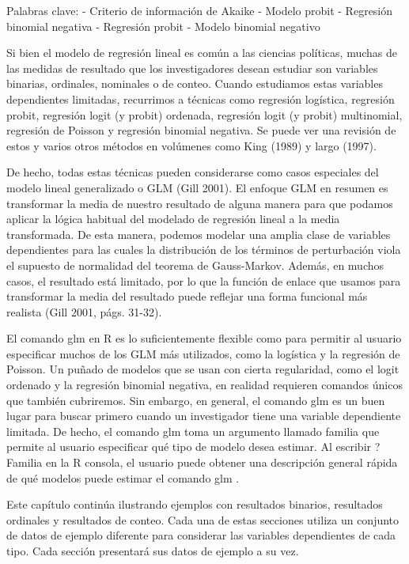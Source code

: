 \documentclass[
]{book}
\begin{document}
Palabras clave:
- Criterio de información de Akaike
- Modelo probit
- Regresión binomial negativa
- Regresión probit
- Modelo binomial negativo

Si bien el modelo de regresión lineal es común a las ciencias políticas, muchas de las medidas de resultado que los investigadores desean estudiar son variables binarias, ordinales, nominales o de conteo. Cuando estudiamos estas variables dependientes limitadas, recurrimos a técnicas como regresión logística, regresión probit, regresión logit (y probit) ordenada, regresión logit (y probit) multinomial, regresión de Poisson y regresión binomial negativa. Se puede ver una revisión de estos y varios otros métodos en volúmenes como King (1989) y largo (1997).

De hecho, todas estas técnicas pueden considerarse como casos especiales del modelo lineal generalizado o GLM (Gill 2001). El enfoque GLM en resumen es transformar la media de nuestro resultado de alguna manera para que podamos aplicar la lógica habitual del modelado de regresión lineal a la media transformada. De esta manera, podemos modelar una amplia clase de variables dependientes para las cuales la distribución de los términos de perturbación viola el supuesto de normalidad del teorema de Gauss-Markov. Además, en muchos casos, el resultado está limitado, por lo que la función de enlace que usamos para transformar la media del resultado puede reflejar una forma funcional más realista (Gill 2001, págs. 31-32).

El comando glm en R es lo suficientemente flexible como para permitir al usuario especificar muchos de los GLM más utilizados, como la logística y la regresión de Poisson. Un puñado de modelos que se usan con cierta regularidad, como el logit ordenado y la regresión binomial negativa, en realidad requieren comandos únicos que también cubriremos. Sin embargo, en general, el comando glm es un buen lugar para buscar primero cuando un investigador tiene una variable dependiente limitada. De hecho, el comando glm toma un argumento llamado familia que permite al usuario especificar qué tipo de modelo desea estimar. Al escribir ? Familia en la R consola, el usuario puede obtener una descripción general rápida de qué modelos puede estimar el comando glm .

Este capítulo continúa ilustrando ejemplos con resultados binarios, resultados ordinales y resultados de conteo. Cada una de estas secciones utiliza un conjunto de datos de ejemplo diferente para considerar las variables dependientes de cada tipo. Cada sección presentará sus datos de ejemplo a su vez.
\end{document}
